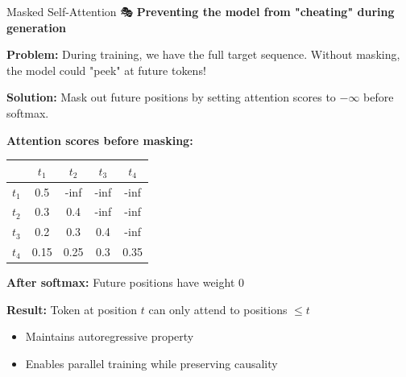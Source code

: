 \documentclass[aspectratio=169]{beamer}
\begin{document}
\begin{frame}{Masked Self-Attention 🎭}
\textbf{Preventing the model from "cheating" during generation}

\vspace{1em}

\textbf{Problem:} During training, we have the full target sequence. Without masking, the model could "peek" at future tokens!

\vspace{0.5em}

\textbf{Solution:} Mask out future positions by setting attention scores to $-\infty$ before softmax.

\vspace{1em}

\begin{center}
\small
\textbf{Attention scores before masking:}

\begin{tabular}{c|cccc}
 & $t_1$ & $t_2$ & $t_3$ & $t_4$ \\
\hline
$t_1$ & 0.5 & \cellcolor{red!30}-inf & \cellcolor{red!30}-inf & \cellcolor{red!30}-inf \\
$t_2$ & 0.3 & 0.4 & \cellcolor{red!30}-inf & \cellcolor{red!30}-inf \\
$t_3$ & 0.2 & 0.3 & 0.4 & \cellcolor{red!30}-inf \\
$t_4$ & 0.15 & 0.25 & 0.3 & 0.35 \\
\end{tabular}

\vspace{0.5em}

\textbf{After softmax:} Future positions have weight 0
\end{center}

\vspace{1em}

\textbf{Result:} Token at position $t$ can only attend to positions $\leq t$
\begin{itemize}\setlength{\itemsep}{0pt}
    \item Maintains autoregressive property
    \item Enables parallel training while preserving causality
\end{itemize}
\end{frame}
\end{document}
